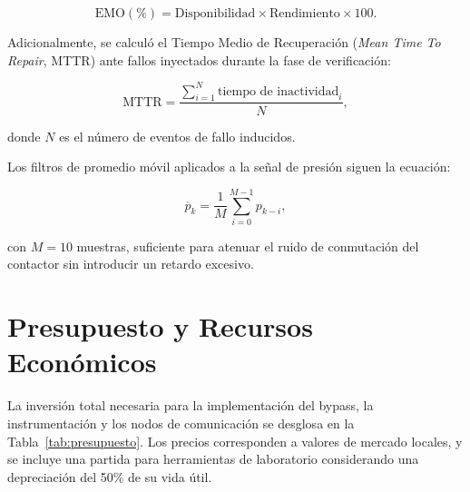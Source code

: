 \begin{equation}
    \text{EMO} (\%) = \text{Disponibilidad} \times \text{Rendimiento} \times 100.
\end{equation}

Adicionalmente, se calculó el Tiempo Medio de Recuperación (\textit{Mean Time To Repair}, MTTR) ante fallos inyectados durante la fase de verificación:

\begin{equation}
    \text{MTTR} = \frac{\sum_{i=1}^{N} \text{tiempo de inactividad}_i}{N},
\end{equation}

donde \(N\) es el número de eventos de fallo inducidos.

Los filtros de promedio móvil aplicados a la señal de presión siguen la ecuación:

\begin{equation}
    \overline{p}_k = \frac{1}{M} \sum_{i=0}^{M-1} p_{k-i},
\end{equation}

con \(M=10\) muestras, suficiente para atenuar el ruido de conmutación del contactor sin introducir un retardo excesivo.

\section{Presupuesto y Recursos Económicos}

La inversión total necesaria para la implementación del bypass, la instrumentación y los nodos de comunicación se desglosa en la Tabla~\ref{tab:presupuesto}. Los precios corresponden a valores de mercado locales, y se incluye una partida para herramientas de laboratorio considerando una depreciación del 50\% de su vida útil.

